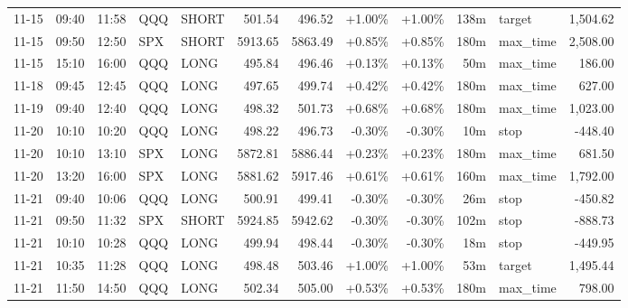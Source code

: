 \documentclass[11pt,a4paper,twoside]{article}
\begin{document}
\begin{center}
\begin{longtable}{>{\color{txtmain}}l l l l l r r r r r >{\color{txtmain}}l r}
11-15 & 09:40 & 11:58 & QQQ & SHORT & 501.54 & 496.52 & \textcolor{wingreen}{+1.00\%} & \textcolor{wingreen}{+1.00\%} & 138m & target & \textcolor{wingreen}{1,504.62} \\
11-15 & 09:50 & 12:50 & SPX & SHORT & 5913.65 & 5863.49 & \textcolor{wingreen}{+0.85\%} & \textcolor{wingreen}{+0.85\%} & 180m & max\_time & \textcolor{wingreen}{2,508.00} \\
11-15 & 15:10 & 16:00 & QQQ & LONG & 495.84 & 496.46 & \textcolor{wingreen}{+0.13\%} & \textcolor{wingreen}{+0.13\%} & 50m & max\_time & \textcolor{wingreen}{186.00} \\
11-18 & 09:45 & 12:45 & QQQ & LONG & 497.65 & 499.74 & \textcolor{wingreen}{+0.42\%} & \textcolor{wingreen}{+0.42\%} & 180m & max\_time & \textcolor{wingreen}{627.00} \\
11-19 & 09:40 & 12:40 & QQQ & LONG & 498.32 & 501.73 & \textcolor{wingreen}{+0.68\%} & \textcolor{wingreen}{+0.68\%} & 180m & max\_time & \textcolor{wingreen}{1,023.00} \\
11-20 & 10:10 & 10:20 & QQQ & LONG & 498.22 & 496.73 & \textcolor{lossred}{-0.30\%} & \textcolor{lossred}{-0.30\%} & 10m & stop & \textcolor{lossred}{-448.40} \\
11-20 & 10:10 & 13:10 & SPX & LONG & 5872.81 & 5886.44 & \textcolor{wingreen}{+0.23\%} & \textcolor{wingreen}{+0.23\%} & 180m & max\_time & \textcolor{wingreen}{681.50} \\
11-20 & 13:20 & 16:00 & SPX & LONG & 5881.62 & 5917.46 & \textcolor{wingreen}{+0.61\%} & \textcolor{wingreen}{+0.61\%} & 160m & max\_time & \textcolor{wingreen}{1,792.00} \\
11-21 & 09:40 & 10:06 & QQQ & LONG & 500.91 & 499.41 & \textcolor{lossred}{-0.30\%} & \textcolor{lossred}{-0.30\%} & 26m & stop & \textcolor{lossred}{-450.82} \\
11-21 & 09:50 & 11:32 & SPX & SHORT & 5924.85 & 5942.62 & \textcolor{lossred}{-0.30\%} & \textcolor{lossred}{-0.30\%} & 102m & stop & \textcolor{lossred}{-888.73} \\
11-21 & 10:10 & 10:28 & QQQ & LONG & 499.94 & 498.44 & \textcolor{lossred}{-0.30\%} & \textcolor{lossred}{-0.30\%} & 18m & stop & \textcolor{lossred}{-449.95} \\
11-21 & 10:35 & 11:28 & QQQ & LONG & 498.48 & 503.46 & \textcolor{wingreen}{+1.00\%} & \textcolor{wingreen}{+1.00\%} & 53m & target & \textcolor{wingreen}{1,495.44} \\
11-21 & 11:50 & 14:50 & QQQ & LONG & 502.34 & 505.00 & \textcolor{wingreen}{+0.53\%} & \textcolor{wingreen}{+0.53\%} & 180m & max\_time & \textcolor{wingreen}{798.00} \\

\end{longtable}
\end{center}
\end{document}
